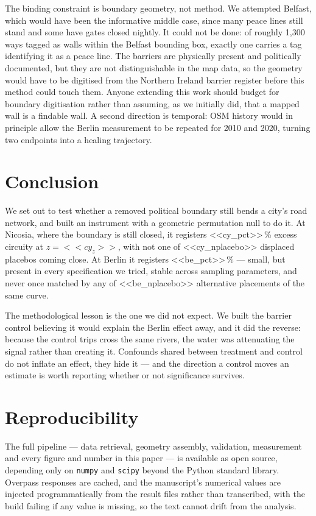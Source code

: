 \documentclass[11pt,a4paper]{article}
\begin{document}
The binding constraint is boundary geometry, not method. We attempted Belfast,
which would have been the informative middle case, since many peace lines still
stand and some have gates closed nightly. It could not be done: of roughly 1,300
ways tagged as walls within the Belfast bounding box, exactly one carries a tag
identifying it as a peace line. The barriers are physically present and
politically documented, but they are not distinguishable in the map data, so the
geometry would have to be digitised from the Northern Ireland barrier register
before this method could touch them. Anyone extending this work should budget
for boundary digitisation rather than assuming, as we initially did, that a
mapped wall is a findable wall. A second direction is temporal: OSM history would in
principle allow the Berlin measurement to be repeated for 2010 and 2020, turning
two endpoints into a healing trajectory.

\section{Conclusion}

We set out to test whether a removed political boundary still bends a city's
road network, and built an instrument with a geometric permutation null to do
it. At Nicosia, where the boundary is still closed, it registers <<cy_pct>>\,\%
excess circuity at $z = <<cy_z>>$, with not one of <<cy_nplacebo>> displaced
placebos coming close. At Berlin it registers <<be_pct>>\,\% --- small, but
present in every specification we tried, stable across sampling parameters, and
never once matched by any of <<be_nplacebo>> alternative placements of the same
curve.

The methodological lesson is the one we did not expect. We built the barrier
control believing it would explain the Berlin effect away, and it did the
reverse: because the control trips cross the same rivers, the water was
attenuating the signal rather than creating it. Confounds shared between
treatment and control do not inflate an effect, they hide it --- and the
direction a control moves an estimate is worth reporting whether or not
significance survives.

\section*{Reproducibility}

The full pipeline --- data retrieval, geometry assembly, validation, measurement
and every figure and number in this paper --- is available as open source,
depending only on \texttt{numpy} and \texttt{scipy} beyond the Python standard
library. Overpass responses are cached, and the manuscript's numerical values
are injected programmatically from the result files rather than transcribed,
with the build failing if any value is missing, so the text cannot drift from
the analysis.
\end{document}
